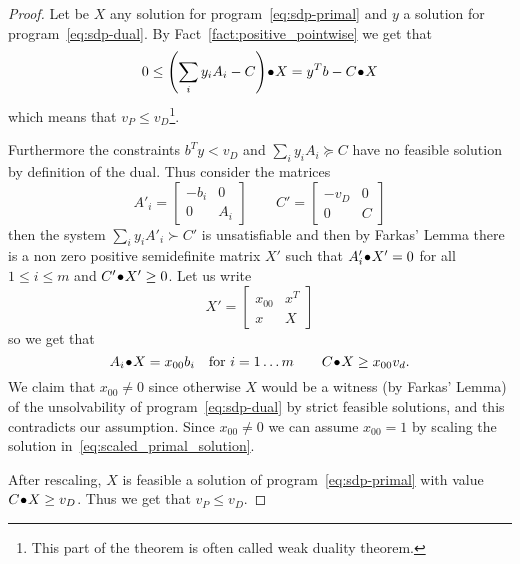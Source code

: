 \documentclass[a4paper,twoside,justified]{tufte-handout}
\begin{document}
\begin{proof}
  Let be $X$ any solution for program~\eqref{eq:sdp-primal} and $ y $
  a solution for program~\eqref{eq:sdp-dual}. By
  Fact~\ref{fact:positive_pointwise} we get that
  \begin{equation}
    0 \leq {\left(\sum_{i} y_{i} A_{i}-C\right)}\!\bullet\!{X} = y^{T}b - {C}\!\bullet\!{X} 
  \end{equation}
  which means that $ v_{P} \leq v_{D}$\footnote{This part of the
    theorem is often called weak duality theorem.}.

  Furthermore the constraints $ b^{T}y < v_{D} $ and $
  \sum_{i}y_{i}A_{i} \succeq C $ have no feasible solution by
  definition of the dual. Thus consider the matrices 
  \begin{equation}
    A'_{i} = \begin{bmatrix}
      -b_{i} & 0\\
      0 & A_{i}
    \end{bmatrix}
    \qquad
    C' = \begin{bmatrix}
      -v_{D} & 0\\
      0 & C
  \end{bmatrix}
  \end{equation}
  then the system $ \sum_{i}y_{i}A'_{i} \succ C' $ is unsatisfiable
  and then by Farkas' Lemma there is a non zero positive semidefinite
  matrix $X'$ such that $ {A'_{i}}\!\bullet\!{X'} = 0 $ for all $
  1\leq i\leq m $ and ${C'}\!\bullet\!{X'} \geq 0 $. Let us write
  \begin{equation}
    X'=\begin{bmatrix}
      x_{00} & x^{T}\\
      x & X
    \end{bmatrix}
  \end{equation}
  so we get that 
  \begin{equation}\label{eq:scaled_primal_solution}
    \pointwiseprod{A_{i}}{X} = x_{00}b_{i} \quad 
    \text{for $i=1\ldots m$}
    \qquad 
    \pointwiseprod{C}{X} \geq x_{00}v_{d}.
  \end{equation}
  We claim that $ x_{00} \not= 0$ since otherwise $ X $  would
  be a witness (by Farkas' Lemma) of the unsolvability of
  program~\eqref{eq:sdp-dual} by strict feasible solutions, and this
  contradicts our assumption. Since $ x_{00}\not=0 $ we can assume $
  x_{00}=1 $ by scaling the solution in~\eqref{eq:scaled_primal_solution}. 

  After rescaling, $ X $ is feasible a solution of
  program~\eqref{eq:sdp-primal} with value $ {C}\!\bullet\!{X}\geq
  v_{D} $. Thus we get that $ v_{P}\leq v_{D} $.
\end{proof}
\end{document}
